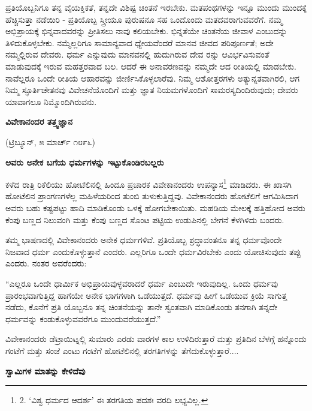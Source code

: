 ಪ್ರತಿಯೊಬ್ಬನಿಗೂ ತನ್ನ ವೈಯಕ್ತಿಕತೆ, ತನ್ನದೇ ವಿಶಿಷ್ಟ ಚಿಂತನೆ ಇರಬೇಕು. ಮತಪಂಥಗಳನ್ನು ಇನ್ನೂ ಮುಂದು ಮುಂದಕ್ಕೆ ಹೆಚ್ಚಿಸುತ್ತಾ ನಡೆಯಿರಿ - ಪ್ರತಿಯೊಬ್ಬ ಸ್ತ್ರೀಯೂ ಪುರುಷನೂ ಸಹ ಒಂದೊಂದು ಮತದವರಾಗುವವರೆಗೆ. ನಮ್ಮ ಅಭಿಪ್ರಾಯಕ್ಕೆ ಭಿನ್ನವಾದವರನ್ನು ಪ್ರೀತಿಸಲು ನಾವು ಕಲಿಯಬೇಕು. ಭಿನ್ನತೆಯೇ ಚಿಂತನೆಯ ಜೀವಾಳ ಎಂಬುದನ್ನು ತಿಳಿದುಕೊಳ್ಳಬೇಕು. ನಮ್ಮೆಲ್ಲರಿಗೂ ಸಾಮಾನ್ಯವಾದ ಧ್ಯೇಯವೆಂದರೆ ಮಾನವ ಜೀವದ ಪರಿಪೂರ್ಣತೆ; ಅದೇ ನಮ್ಮಲ್ಲಿರುವ ದೇವರು. ಧರ್ಮ ಎನ್ನುವುದು ಮಾನವನಲ್ಲಿ ಹುದುಗಿರುವ ದೇವ ರನ್ನು ಆವಿರ್ಭವಿಸುವಂತೆ ಮಾಡುವುದಕ್ಕೆ ಇರುವ ಮಹತ್ತರವಾದ ಬಲ. ಆದರೆ ಈ ಅನಾವರಣವನ್ನು ನಮ್ಮದೇ ಆದ ರೀತಿಯಲ್ಲಿ ಮಾಡಬೇಕು. ನಾವೆಲ್ಲರೂ ಒಂದೇ ರೀತಿಯ ಆಹಾರವನ್ನು ಜೀರ್ಣಿಸಿಕೊಳ್ಳಲಾರೆವು. ನಿಮ್ಮ ಆಶೋತ್ತರಗಳು ಅತ್ಯುನ್ನತವಾಗಿರಲಿ, ಆಗ ನಿಮ್ಮ ಸ್ಫೂರ್ತಿಚೇತನವು ವಿವೇಚನೆಯೊಂದಿಗೆ ಮತ್ತು ಜ್ಞಾತ ನಿಯಮಗಳೊಂದಿಗೆ ಸಾಮರಸ್ಯದಿಂದಿರುವುದು; ದೇವರು ಯಾವಾಗಲೂ ನಿಮ್ಮೊಂದಿಗಿರುವನು.

\begin{center}
\textbf{ವಿವೇಕಾನಂದರ ತತ್ತ್ವಜ್ಞಾನ}
\end{center}

\begin{center}
(ಟ್ರಿಬ್ಯೂನ್, ೫ ಮಾರ್ಚ್ ೧೮೯೬)
\end{center}

\begin{center}
\textbf{ಅವರು ಅನೇಕ ಬಗೆಯ ಧರ್ಮಗಳನ್ನು ಇಟ್ಟುಕೊಂಡಿರಬಲ್ಲರು}
\end{center}

ಕಳೆದ ರಾತ್ರಿ ರಿಕೆಲಿಯು ಹೋಟೆಲಿನಲ್ಲಿ ಹಿಂದೂ ಪ್ರಚಾರಕ ವಿವೇಕಾನಂದರು ಉಪನ್ಯಾಸ\footnote{2. ‘ವಿಶ್ವ ಧರ್ಮದ ಆದರ್ಶ’ ಈ ತರಗತಿಯ ಪದಶಃ ವರದಿ ಲಭ್ಯವಿಲ್ಲ.} ಮಾಡಿದರು. ಈ ಖಾಸಗಿ ಹೋಟೆಲಿನ ಪ್ರಾಂಗಣಗಳೆಲ್ಲ ಮಹಿಳೆಯರಿಂದ ತುಂಬಿ ತುಳುಕುತ್ತಿದ್ದವು. ವಿವೇಕಾನಂದರು ಹೋಟೆಲಿಗೆ ಆಗಮಿಸಿದಾಗ ಅವರು ಬಹು ಕಷ್ಟಪಟ್ಟು ಹಾದಿ ಮಾಡಿಕೊಂಡು ಒಳಕ್ಕೆ ಹೋಗಬೇಕಾಯಿತು. ಮಹಡಿಯ ಮೇಲಕ್ಕೆ ಹತ್ತಿಹೋದ ಅವರು ಕೆಂಪು ಬಣ್ಣದ ನಿಲುವಂಗಿ ಮತ್ತು ಕೆಂಪು ಬಣ್ಣದ ಸೊಂಟ ಪಟ್ಟಿಯ ಉಡುಪಿನಲ್ಲಿ ಬೇಗನೆ ಕೆಳಗಿಳಿದು ಬಂದರು.

ತಮ್ಮ ಭಾಷಣದಲ್ಲಿ ವಿವೇಕಾನಂದರು ಅನೇಕ ಧರ್ಮಗಳಿವೆ. ಪ್ರತಿಯೊಬ್ಬ ಶ್ರದ್ಧಾವಂತನೂ ತನ್ನ ಧರ್ಮವೊಂದೇ ನಿಜವಾದ ಧರ್ಮ ಎಂದುಕೊಳ್ಳುತ್ತಾನೆ ಎಂದರು. ಎಲ್ಲರಿಗೂ ಒಂದೇ ಧರ್ಮವಿರಬೇಕು ಎಂದು ಯೋಚಿಸುವುದು ತಪ್ಪು ಎಂದರು. ನಂತರ ಅವರೆಂದರು:

“ಎಲ್ಲರೂ ಒಂದೇ ಧಾರ್ಮಿಕ ಅಭಿಪ್ರಾಯವುಳ್ಳವರಾದರೆ ಧರ್ಮ ಎಂಬುದೇ ಇರುವುದಿಲ್ಲ. ಒಂದು ಧರ್ಮವು ಪ್ರಾರಂಭವಾಗುತ್ತಿದ್ದ ಹಾಗೆಯೇ ಅನೇಕ ಭಾಗಗಳಾಗಿ ಒಡೆಯುತ್ತದೆ. ಧರ್ಮವು ಹೀಗೆ ಒಡೆಯುವ ಕ್ರಿಯೆ ಸಾಗುತ್ತ ನಡೆದು, ಕೊನೆಗೆ ಪ್ರತಿ ಯೊಬ್ಬನೂ ತನ್ನ ಚಿಂತನೆಯನ್ನು ತಾನೇ ಸ್ವಂತವಾಗಿ ಮಾಡಿಕೊಂಡು ತನಗಾಗಿ ತನ್ನದೇ ಧರ್ಮವನ್ನು ಕಂಡುಕೊಳ್ಳುವವರೆಗೂ ಮುಂದುವರೆಯುತ್ತದೆ.”

ವಿವೇಕಾನಂದರು ಡೆಟ್ರಾಯಿಟ್ನಲ್ಲಿ ಸುಮಾರು ಎರಡು ವಾರಗಳ ಕಾಲ ಉಳಿದಿರುತ್ತಾರೆ ಮತ್ತು ಪ್ರತಿದಿನ ಬೆಳಗ್ಗೆ ಹನ್ನೊಂದು ಗಂಟೆಗೆ ಮತ್ತು ಸಂಜೆ ಎಂಟು ಗಂಟೆಗೆ ಹೋಟೆಲಿನಲ್ಲಿ ತರಗತಿಗಳನ್ನು ತೆಗೆದುಕೊಳ್ಳುತ್ತಾರೆ....

\begin{center}
\textbf{ಸ್ವಾಮಿಗಳ ಮಾತನ್ನು ಕೇಳಿದೆವು}
\end{center}

